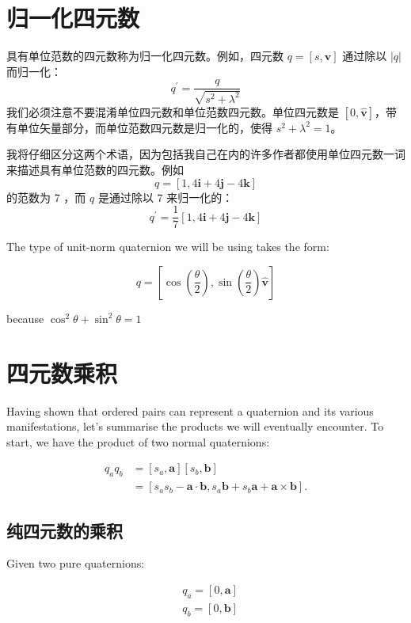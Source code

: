 \section{归一化四元数}
具有单位范数的四元数称为归一化四元数。例如，四元数 $q=[s, \mathbf{v}]$ 通过除以 $|q|$ 而归一化：
$$
    q^{\prime}=\frac{q}{\sqrt{s^{2}+\lambda^{2}}}
$$
我们必须注意不要混淆单位四元数和单位范数四元数。单位四元数是 $[0,\hat{\mathbf{v}}]$，带有单位矢量部分，而单位范数四元数是归一化的，使得 $s^{2}+\lambda^{2}=1$。

我将仔细区分这两个术语，因为包括我自己在内的许多作者都使用单位四元数一词来描述具有单位范数的四元数。例如
$$
    q=[1,4 \mathbf{i}+4 \mathbf{j}-4 \mathbf{k}]
$$
的范数为 7 ，而 $q$ 是通过除以 7 来归一化的：
$$
    q^{\prime}=\frac{1}{7}[1,4 \mathbf{i}+4 \mathbf{j}-4 \mathbf{k}]
$$

The type of unit-norm quaternion we will be using takes the form:

$$
    q=\left[\cos \left(\frac{\theta}{2}\right), \sin \left(\frac{\theta}{2}\right) \hat{\mathbf{v}}\right]
$$

because $\cos ^{2} \theta+\sin ^{2} \theta=1$

\section{四元数乘积}
Having shown that ordered pairs can represent a quaternion and its various manifestations, let's summarise the products we will eventually encounter. To start, we have the product of two normal quaternions:

$$
    \begin{aligned}
        q_{a} q_{b} & =\left[s_{a}, \mathbf{a}\right]\left[s_{b}, \mathbf{b}\right]                                                           \\
                    & =\left[s_{a} s_{b}-\mathbf{a} \cdot \mathbf{b}, s_{a} \mathbf{b}+s_{b} \mathbf{a}+\mathbf{a} \times \mathbf{b}\right] .
    \end{aligned}
$$

\subsection{纯四元数的乘积}
Given two pure quaternions:

$$
    \begin{aligned}
         & q_{a}=[0, \mathbf{a}] \\
         & q_{b}=[0, \mathbf{b}]
    \end{aligned}
$$

